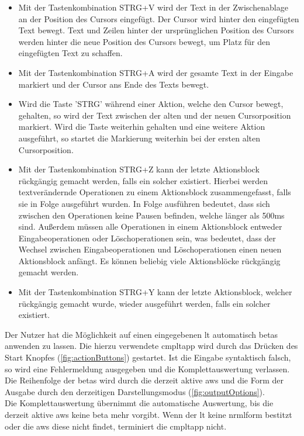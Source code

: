 \documentclass[parskip=full,11pt,twoside]{scrartcl}
\begin{document}
\begin{itemize}
	\item Mit der Tastenkombination STRG+V wird der Text in der Zwischenablage an der Position des Cursors eingefügt. Der Cursor wird hinter den eingefügten Text bewegt. Text und Zeilen hinter der ursprünglichen Position des Cursors werden hinter die neue Position des Cursors bewegt, um Platz für den eingefügten Text zu schaffen.
	\item Mit der Tastenkombination STRG+A wird der gesamte Text in der Eingabe markiert und der Cursor ans Ende des Texts bewegt.
	\item Wird die Taste 'STRG' während einer Aktion, welche den Cursor bewegt, gehalten, so wird der Text zwischen der alten und der neuen Cursorposition markiert. Wird die Taste weiterhin gehalten und eine weitere Aktion ausgeführt, so startet die Markierung weiterhin bei der ersten alten Cursorposition.
	\item Mit der Tastenkombination STRG+Z kann der letzte Aktionsblock rückgängig gemacht werden, falls ein solcher existiert. 
	Hierbei werden textverändernde Operationen zu einem Aktionsblock zusammengefasst, falls sie in Folge ausgeführt wurden. In Folge ausführen bedeutet, dass sich zwischen den Operationen keine Pausen befinden, welche länger als 500ms sind. Außerdem müssen alle Operationen in einem Aktionsblock entweder Eingabeoperationen oder Löschoperationen sein, was bedeutet, dass der Wechsel zwischen Eingabeoperationen und Löschoperationen einen neuen Aktionsblock anfängt.
	Es können beliebig viele Aktionsblöcke rückgängig gemacht werden.
	\item Mit der Tastenkombination STRG+Y kann der letzte Aktionsblock, welcher rückgängig gemacht wurde, wieder ausgeführt werden, falls ein solcher existiert.
\end{itemize}

Der Nutzer hat die Möglichkeit auf einen eingegebenen \gls{lt} automatisch \glspl{beta} anwenden zu lassen. 
Die hierzu verwendete \gls{cmpltapp} wird durch das Drücken des Start Knopfes (\cref{fig:actionButtons}) gestartet.
Ist die Eingabe syntaktisch falsch, so wird eine Fehlermeldung ausgegeben und die Komplettauswertung verlassen.
Die Reihenfolge der \glspl{beta} wird durch die derzeit aktive \gls{aws} und die Form der Ausgabe durch den derzeitigen Darstellungsmodus (\cref{fig:outputOptions}).\\
Die Komplettauswertung übernimmt die automatische Auswertung, bis die derzeit aktive \gls{aws} keine \gls{beta} mehr vorgibt.
Wenn der \gls{lt} keine \gls{nrmlform} bestitzt oder die \gls{aws} diese nicht findet, terminiert die \gls{cmpltapp} nicht. 
\end{document}
